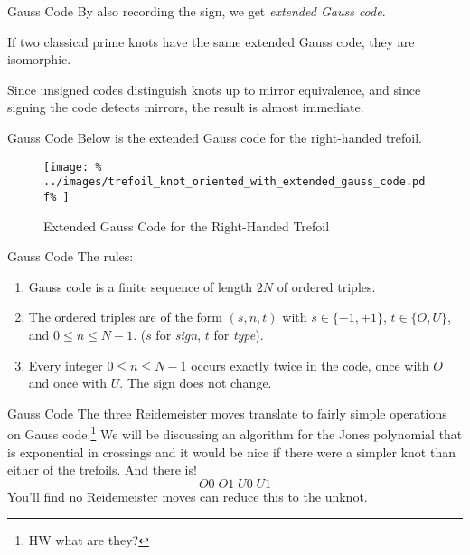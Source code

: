 \documentclass{beamer}
\begin{document}
    \begin{frame}{Gauss Code}
        By also recording the sign, we get \textit{extended Gauss code}.
        \begin{theorem}
            If two classical prime knots have the same extended Gauss code,
            they are isomorphic.
        \end{theorem}
        Since unsigned codes distinguish knots up to mirror equivalence, and
        since signing the code detects mirrors, the result is almost immediate.
    \end{frame}
    \begin{frame}{Gauss Code}
        Below is the extended Gauss code for the right-handed trefoil.
        \begin{figure}
            \centering
            \texttt{[image: \%
                ../images/trefoil\_knot\_oriented\_with\_extended\_gauss\_code.pdf\%
            ]}
            \caption{Extended Gauss Code for the Right-Handed Trefoil}
            \label{fig:right_hand_trefoil_extended_gauss}
        \end{figure}
    \end{frame}
    \begin{frame}{Gauss Code}
        The rules:
        \begin{enumerate}
            \item Gauss code is a finite sequence of length $2N$ of ordered
                  triples.
            \item The ordered triples are of the form $(s,n,t)$ with
                  $s\in\{-1,+1\}$, $t\in\{O,U\}$, and $0\leq{n}\leq{N-1}$.
                  ($s$ for \textit{sign}, $t$ for \textit{type}).
            \item Every integer $0\leq{n}\leq{N-1}$ occurs exactly twice in the
                  code, once with $O$ and once with $U$. The sign does not
                  change.
        \end{enumerate}
    \end{frame}
    \begin{frame}{Gauss Code}
        The three Reidemeister moves translate to fairly simple operations on
        Gauss code.\footnote{HW what are they?}
        We will be discussing an algorithm for the Jones polynomial that is
        exponential in crossings and it would be nice if there were a simpler
        knot than either of the trefoils. And there is!
        \begin{equation}
            O0\;O1\;U0\;U1
        \end{equation}
        You'll find no Reidemeister moves can reduce this to the unknot.
    \end{frame}
\end{document}
